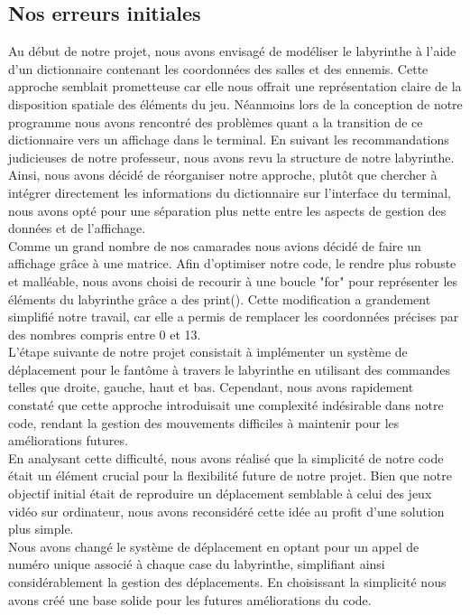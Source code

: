 \documentclass[titlepage]{report}
\begin{document}
\subsection{Nos erreurs initiales}
\hspace*{0.5cm}Au début de notre projet, nous avons envisagé de modéliser le labyrinthe à l'aide d'un dictionnaire contenant les coordonnées des salles et des ennemis. Cette approche semblait prometteuse car elle nous offrait une représentation claire de la disposition spatiale des éléments du jeu. Néanmoins lors de la conception de notre programme nous avons rencontré des problèmes quant a la transition de ce dictionnaire vers un affichage dans le terminal.
En suivant les recommandations judicieuses de notre professeur, nous avons revu la structure de notre labyrinthe. \\
\hspace*{0.5cm}Ainsi, nous avons décidé de réorganiser notre approche, plutôt que chercher à intégrer directement les informations du dictionnaire sur l'interface du terminal, nous avons opté pour une séparation plus nette entre les aspects de gestion des données et de l'affichage.\\
\hspace*{0.5cm}Comme un grand nombre de nos camarades nous avions décidé de faire un affichage grâce à une matrice. Afin d'optimiser notre code, le rendre plus robuste et malléable, nous avons choisi de recourir à une boucle "for" pour représenter les éléments du labyrinthe grâce a des print(). Cette modification a grandement simplifié notre travail, car elle a permis de remplacer les coordonnées précises par des nombres compris entre 0 et 13.\\
\hspace*{0.5cm}L'étape suivante de notre projet consistait à implémenter un système de déplacement pour le fantôme à travers le labyrinthe en utilisant des commandes telles que droite, gauche, haut et bas.
Cependant, nous avons rapidement constaté que cette approche introduisait une complexité indésirable dans notre code, rendant la gestion des mouvements difficiles à maintenir pour les améliorations futures.\\
\hspace*{0.5cm}En analysant cette difficulté, nous avons réalisé que la simplicité de notre code était un élément crucial pour la flexibilité future de notre projet. Bien que notre objectif initial était de reproduire un déplacement semblable à celui des jeux vidéo sur ordinateur, nous avons reconsidéré cette idée au profit d'une solution plus simple.\\
\hspace*{0.5cm}Nous avons changé le système de déplacement en optant pour un appel de numéro unique associé à chaque case du labyrinthe, simplifiant ainsi considérablement la gestion des déplacements. En choisissant la simplicité nous avons créé une base solide pour les futures améliorations du code.
\end{document}
